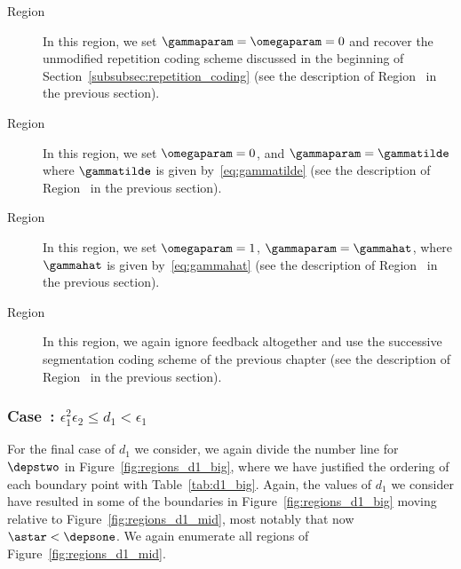 

\begin{description}
	\item[Region~] In this region, we set $\gammaparam = \omegaparam = 0$ and recover the unmodified repetition coding scheme discussed in the beginning of Section~\ref{subsubsec:repetition_coding} (see the description of Region~ in the previous section).

	\item[Region~] In this region, we set $\omegaparam = 0$, and $\gammaparam = \gammatilde$ where $\gammatilde$ is given by~\eqref{eq:gammatilde} (see the description of Region~ in the previous section).
	
	\item[Region~]  In this region, we set $\omegaparam= 1$, $\gammaparam = \gammahat$, where $\gammahat$ is given by~\eqref{eq:gammahat} (see the description of Region~ in the previous section).

	
	\item[Region~]  In this region, we again ignore feedback altogether and use the successive segmentation coding scheme of the previous chapter (see the description of Region~ in the previous section).
\end{description}

\subsubsection{Case~: $\epsilon_1^2\epsilon_2 \leq d_1 < \epsilon_1$}

For the final case of $d_1$ we consider, we again divide the number line for $\depstwo$ in Figure~\ref{fig:regions_d1_big}, where we have justified the ordering of each boundary point with Table~\ref{tab:d1_big}.  Again, the values of $d_1$ we consider have resulted in some of the boundaries in Figure~\ref{fig:regions_d1_big} moving relative to Figure~\ref{fig:regions_d1_mid}, most notably that now $\astar < \depsone$.  We again enumerate all regions of Figure~\ref{fig:regions_d1_mid}.



